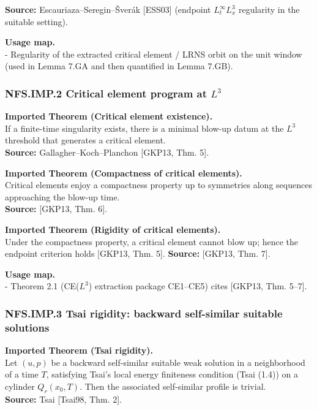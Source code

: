 \documentclass[
  11pt,
]{article}
\begin{document}
\textbf{Source:} Escauriaza--Seregin--Šverák {[}ESS03{]} (endpoint \(L^\infty_tL^3_x\) regularity in the suitable setting).

\textbf{Usage map.}\\
- Regularity of the extracted critical element / LRNS orbit on the unit window (used in Lemma 7.GA and then quantified in Lemma 7.GB).

\hypertarget{nfs.imp.2-critical-element-program-at-l3}{%
\subsubsection{\texorpdfstring{NFS.IMP.2 Critical element program at \(L^3\)}{NFS.IMP.2 Critical element program at L\^{}3}}\label{nfs.imp.2-critical-element-program-at-l3}}

\textbf{Imported Theorem (Critical element existence).}\\
If a finite-time singularity exists, there is a minimal blow-up datum at the \(L^3\) threshold that generates a critical element.\\
\textbf{Source:} Gallagher--Koch--Planchon {[}GKP13, Thm. 5{]}.

\textbf{Imported Theorem (Compactness of critical elements).}\\
Critical elements enjoy a compactness property up to symmetries along sequences approaching the blow-up time.\\
\textbf{Source:} {[}GKP13, Thm. 6{]}.

\textbf{Imported Theorem (Rigidity of critical elements).}\\
Under the compactness property, a critical element cannot blow up; hence the endpoint criterion holds {[}GKP13, Thm. 5{]}. \textbf{Source:} {[}GKP13, Thm. 7{]}.

\textbf{Usage map.}\\
- Theorem 2.1 (CE(\(L^3\)) extraction package CE1--CE5) cites {[}GKP13, Thm. 5--7{]}.

\hypertarget{nfs.imp.3-tsai-rigidity-backward-self-similar-suitable-solutions}{%
\subsubsection{NFS.IMP.3 Tsai rigidity: backward self-similar suitable solutions}\label{nfs.imp.3-tsai-rigidity-backward-self-similar-suitable-solutions}}

\textbf{Imported Theorem (Tsai rigidity).}\\
Let \((u,p)\) be a backward self-similar suitable weak solution in a neighborhood of a time \(T\), satisfying Tsai's local energy finiteness condition (Tsai (1.4)) on a cylinder \(Q_r(x_0,T)\). Then the associated self-similar profile is trivial.\\
\textbf{Source:} Tsai {[}Tsai98, Thm. 2{]}.
\end{document}
